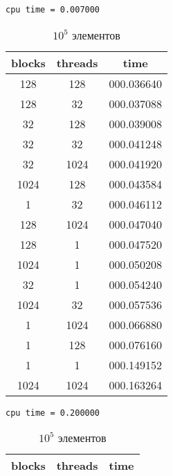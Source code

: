 \documentclass[12pt]{article}
\begin{document}
\begin{table*}[!htb]
	\begin{subtable}{.333\linewidth}
		\caption{$10^3$ элементов}
		\centering

		\lstinline|cpu time = 0.007000|

		\begin{tabular}{|c|c|c|}
			\hline
			blocks & threads & time       \\
			\hline

			128    & 128     & 000.036640 \\
			128    & 32      & 000.037088 \\
			32     & 128     & 000.039008 \\
			32     & 32      & 000.041248 \\
			32     & 1024    & 000.041920 \\
			1024   & 128     & 000.043584 \\
			1      & 32      & 000.046112 \\
			128    & 1024    & 000.047040 \\
			128    & 1       & 000.047520 \\
			1024   & 1       & 000.050208 \\
			32     & 1       & 000.054240 \\
			1024   & 32      & 000.057536 \\
			1      & 1024    & 000.066880 \\
			1      & 128     & 000.076160 \\
			1      & 1       & 000.149152 \\
			1024   & 1024    & 000.163264 \\
			\hline
		\end{tabular}
	\end{subtable}
	\begin{subtable}{.333\linewidth}
		\caption{$10^5$ элементов}
		\centering

		\lstinline|cpu time = 0.200000|

		\begin{tabular}{|c|c|c|}
			\hline
			blocks & threads & time       \\
			\hline


\end{tabular}
\end{subtable}
\end{table*}
\end{document}
